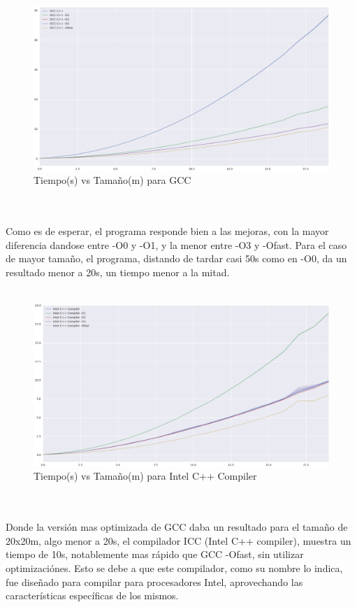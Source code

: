 ~\\
~\\
\begin{figure}[H]
\caption{Tiempo(s) vs Tamaño(m) para GCC}
\includegraphics[width=\textwidth]{imagenes/plot_cpp.png}
\end{figure}
~\\
~\\
Como es de esperar, el programa responde bien a las mejoras, con la mayor diferencia dandose entre -O0 y -O1, y la menor entre -O3 y -Ofast. Para el caso de mayor tamaño, el programa, distando de tardar casi 50s como en -O0, da un resultado menor a 20s, un tiempo menor a la mitad.
~\\
~\\
\begin{figure}[H]
\caption{Tiempo(s) vs Tamaño(m) para Intel C++ Compiler}
\includegraphics[width=\textwidth]{imagenes/plot_icc.png}
\end{figure}
~\\
~\\
Donde la versión mas optimizada de GCC daba un resultado para el tamaño de 20x20m, algo menor a 20s, el compilador ICC (Intel C++ compiler), muestra un tiempo de 10s, notablemente mas rápido que  GCC -Ofast, sin utilizar optimizaciónes. Esto se debe a que este compilador, como su nombre lo indica, fue diseñado para compilar para procesadores Intel, aprovechando las características específicas de los mismos. 
